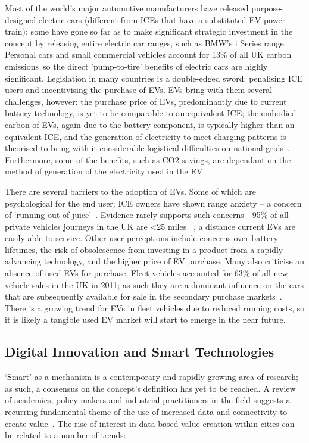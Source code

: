 \documentclass[journal]{IEEEtran}
\begin{document}
Most of the world's major automotive manufacturers have released
purpose-designed electric cars (different from ICEs that have a
substituted EV power train); some have gone so far as to make
significant strategic investment in the concept by releasing entire
electric car ranges, such as BMW's i Series range. Personal cars and
small commercial vehicles account for 13\% of all UK carbon
emissions~\cite{lumsden:2012}so the direct 'pump-to-tire' benefits of
electric cars are highly significant. Legislation in many countries is
a double-edged sword: penalising ICE users and incentivising the
purchase of EVs. EVs bring with them several challenges, however: the
purchase price of EVs, predominantly due to current battery
technology, is yet to be comparable to an equivalent ICE; the embodied
carbon of EVs, again due to the battery component, is typically higher
than an equivalent ICE, and the generation of
electricity to meet charging patterns is theorised to bring with it
considerable logistical difficulties on national
grids~\cite{su-et-al:2011,akhavan-rezai-et-al:2015}. Furthermore, some
of the benefits, such as CO2 savings, are dependant on the method of
generation of the electricity used in the EV.

There are several barriers to the adoption of EVs. Some of which are
psychological for the end user; ICE owners have shown range anxiety --
a concern of `running out of
juice'~\cite{oflev:2011,yilmaz+krein:2012}. Evidence rarely supports
such concerns - 95\% of all private vehicles journeys in the UK are
<25 miles ~\cite{oflev:2011}, a distance current EVs are easily able
to service. Other user perceptions include concerns over battery
lifetimes, the risk of obsolescence from investing in a product from a
rapidly advancing technology, and the higher price of EV purchase.
Many also criticise an absence of used EVs for purchase. Fleet
vehicles accounted for 63\% of all new vehicle sales in the UK in
2011; as such they are a dominant influence on the cars that are
subsequently available for sale in the secondary purchase
markets~\cite{fleets:2012}. There is a growing trend for EVs in fleet
vehicles due to reduced running costs, so it is likely a tangible used
EV market will start to emerge in the near future.


\subsection{Digital Innovation and Smart Technologies}

`Smart' as a mechanism is a contemporary and rapidly growing area of
research; as such, a consensus on the concept's definition has yet to
be reached. A review of academics, policy makers and industrial
practitioners in the field suggests a recurring fundamental theme of
the use of increased data and connectivity to create
value~\cite{komninos:2002,arup-et-al:2011,harrison+abbottdonnelly:2011,batty-et-al:2012,buscher:2014}. The
rise of interest in data-based value creation within cities can be
related to a number of trends:
\end{document}
